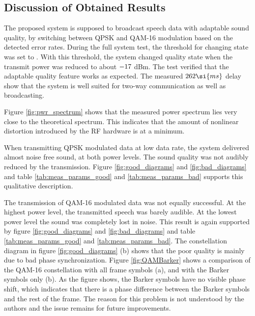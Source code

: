 

\subsection{Discussion of Obtained Results}
The proposed system is supposed to broadcast speech data with adaptable sound quality, by switching between QPSK and QAM-16 modulation based on the detected error rates. During the full system test, the threshold for changing state was set to \BERThreshold. With this threshold, the system changed quality state when the transmit power was reduced to about $-17$ dBm. The test verified that the adaptable quality feature works as expected. The measured $\measDelay \si{ms}$ delay show that the system is well suited for two-way communication as well as broadcasting. 

Figure \ref{fig:pwr_spectrum} shows that the measured power spectrum lies very close to the theoretical spectrum. This indicates that the amount of nonlinear distortion introduced by the RF hardware is at a minimum.

When transmitting QPSK modulated data at low data rate, the system delivered almost noise free sound, at both power levels. The sound quality was not audibly reduced by the transmission. Figure \ref{fig:good_diagrams} and \ref{fig:bad_diagrams} and table \ref{tab:meas_params_good} and \ref{tab:meas_params_bad} supports this qualitative description. 

The transmission of QAM-16 modulated data was not equally successful. At the highest power level, the transmitted speech was barely audible. At the lowest power level the sound was completely lost in noise. This result is again supported by figure \ref{fig:good_diagrams} and \ref{fig:bad_diagrams} and table \ref{tab:meas_params_good} and \ref{tab:meas_params_bad}. The constellation diagram in figure \ref{fig:good_diagrams} (b) shows that the poor quality is mainly due to bad phase synchronization. Figure \ref{fig:QAMBarker} shows a comparison of the QAM-16 constellation with all frame symbols (a), and with the Barker symbols only (b). As the figure shows, the Barker symbols have no visible phase shift, which indicates that there is a phase difference between the Barker symbols and the rest of the frame. The reason for this problem is not understood by the authors and the issue remains for future improvements.

